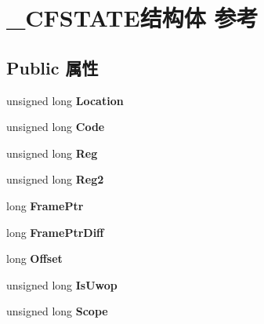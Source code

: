 \hypertarget{struct___c_f_s_t_a_t_e}{}\section{\+\_\+\+C\+F\+S\+T\+A\+T\+E结构体 参考}
\label{struct___c_f_s_t_a_t_e}
\subsection*{Public 属性}
\begin{DoxyCompactItemize}
\item 
\mbox{\label{struct___c_f_s_t_a_t_e_a572c4604b56e476a3c096fc9982dbb24}} 
unsigned long {\bfseries Location}
\item 
\mbox{\label{struct___c_f_s_t_a_t_e_ac7ca5b1f324f439e727d2595ac86affa}} 
unsigned long {\bfseries Code}
\item 
\mbox{\label{struct___c_f_s_t_a_t_e_a519c68d89cb9640a531e24a25c997a5f}} 
unsigned long {\bfseries Reg}
\item 
\mbox{\label{struct___c_f_s_t_a_t_e_a6806bb54a4eb49172d8a6e73e0fd3f66}} 
unsigned long {\bfseries Reg2}
\item 
\mbox{\label{struct___c_f_s_t_a_t_e_a6014232725ca6e40fcb2eb1460199dea}} 
long {\bfseries Frame\+Ptr}
\item 
\mbox{\label{struct___c_f_s_t_a_t_e_a104e28b29c95371ebb7b60f002439707}} 
long {\bfseries Frame\+Ptr\+Diff}
\item 
\mbox{\label{struct___c_f_s_t_a_t_e_aaa6f953aabe52ba369db4c77a23d39b5}} 
long {\bfseries Offset}
\item 
\mbox{\label{struct___c_f_s_t_a_t_e_a2705a24cbc53fe69cd946d45cfb1f8c4}} 
unsigned long {\bfseries Is\+Uwop}
\item 
\mbox{\label{struct___c_f_s_t_a_t_e_a7abadeaecffd2fdb4d540aea10c69ff5}} 
unsigned long {\bfseries Scope}
\item 

\end{DoxyCompactItemize}
